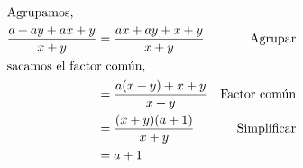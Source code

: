\documentclass{article} %
\begin{document}
\begin{align*}
\intertext{Agrupamos,}
\frac{a+ay+ax+y}{x+y} &= \frac{ax+ay+x+y}{x+y} &\mbox{Agrupar}\\
\intertext{sacamos el factor común,}
&= \frac{a(x+y)+x+y}{x+y} &\mbox{Factor común}\\
&= \frac{(x+y)(a+1)}{x+y} &\mbox{Simplificar}\\
&= a+1
\end{align*}
\end{document}
